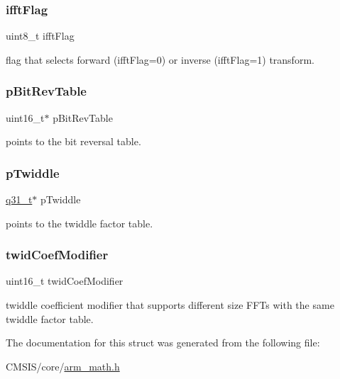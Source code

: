 \subsubsection{\texorpdfstring{ifftFlag}{ifftFlag}}
{\footnotesize\ttfamily uint8\+\_\+t ifft\+Flag}

flag that selects forward (ifft\+Flag=0) or inverse (ifft\+Flag=1) transform. \mbox{\label{structarm__cfft__radix4__instance__q31_a46a2fb328199897af100fea0bfdf59aa}} 
\subsubsection{\texorpdfstring{pBitRevTable}{pBitRevTable}}
{\footnotesize\ttfamily uint16\+\_\+t$\ast$ p\+Bit\+Rev\+Table}

points to the bit reversal table. \mbox{\label{structarm__cfft__radix4__instance__q31_a2505b7d5ec077b244c712797a5253b6d}} 
\subsubsection{\texorpdfstring{pTwiddle}{pTwiddle}}
{\footnotesize\ttfamily \mbox{\hyperlink{arm__math_8h_adc89a3547f5324b7b3b95adec3806bc0}{q31\+\_\+t}}$\ast$ p\+Twiddle}

points to the twiddle factor table. \mbox{\label{structarm__cfft__radix4__instance__q31_afe772e5b5001c9d8e85032115a8df5bf}} 
\subsubsection{\texorpdfstring{twidCoefModifier}{twidCoefModifier}}
{\footnotesize\ttfamily uint16\+\_\+t twid\+Coef\+Modifier}

twiddle coefficient modifier that supports different size F\+F\+Ts with the same twiddle factor table. 

The documentation for this struct was generated from the following file\+:\begin{DoxyCompactItemize}
\item 
C\+M\+S\+I\+S/core/\mbox{\hyperlink{arm__math_8h}{arm\+\_\+math.\+h}}\end{DoxyCompactItemize}

